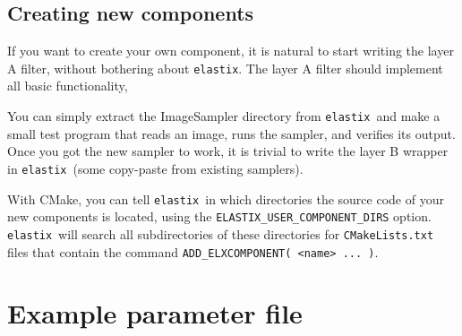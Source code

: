 \documentclass[]{report}
\newcommand{\elastix}{\texttt{elastix}}
\begin{document}
\section{Creating new components}\label{sec:dev:newcomp}

If you want to create your own component, it is natural to start
writing the layer A filter, without bothering about \elastix. The
layer A filter should implement all basic functionality,

You can simply extract the ImageSampler directory from \elastix\ and
make a small test program that reads an image, runs the sampler, and
verifies its output. Once you got the new sampler to work, it is
trivial to write the layer B wrapper in \elastix\ (some copy-paste
from existing samplers).

With CMake, you can tell \elastix\ in which directories the source code of your
new components is located, using the \texttt{ELASTIX\_USER\_COMPONENT\_DIRS}
option. \elastix\ will search all subdirectories of these directories for
\texttt{CMakeLists.txt} files that contain the command
\texttt{ADD_ELXCOMPONENT( <name> ... )}.



\appendix

\chapter{Example parameter file}\label{chp:ExampleParam}
\end{document}
